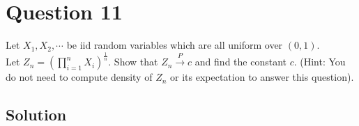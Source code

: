 \section*{Question 11}

Let \( X_{1}, X_{2}, \cdots \) be iid random variables which are all uniform over \( (0,1) \). \\
Let \( Z_{n}=\left(\prod_{i=1}^{n} X_{i}\right)^{\frac{1}{n}} \).
Show that \( Z_{n} \xrightarrow{P} c \) and find the constant \( c \).
(Hint: You do not need to compute density of \( Z_{n} \) or its expectation to answer this question).

\subsection*{Solution}
